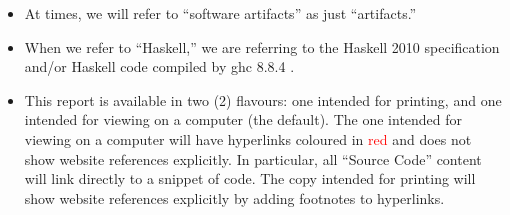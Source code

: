 \begin{itemize}
      \item At times, we will refer to ``software artifacts'' as just
            ``artifacts.''

      \item When we refer to ``Haskell,'' we are referring to the Haskell 2010
            specification \cite{Haskell2010} and/or Haskell code compiled by
            \acs{ghc} 8.8.4 \cite{GHC884}.

      \item This report is available in two (2) flavours: one intended for
            printing, and one intended for viewing on a computer (the default).
            The one intended for viewing on a computer will have hyperlinks
            coloured in \textcolor{red}{red} and does not show website
            references explicitly. In particular, all ``Source Code'' content
            will link directly to a snippet of code. The copy intended for
            printing will show website references explicitly by adding footnotes
            to hyperlinks.

\end{itemize}
